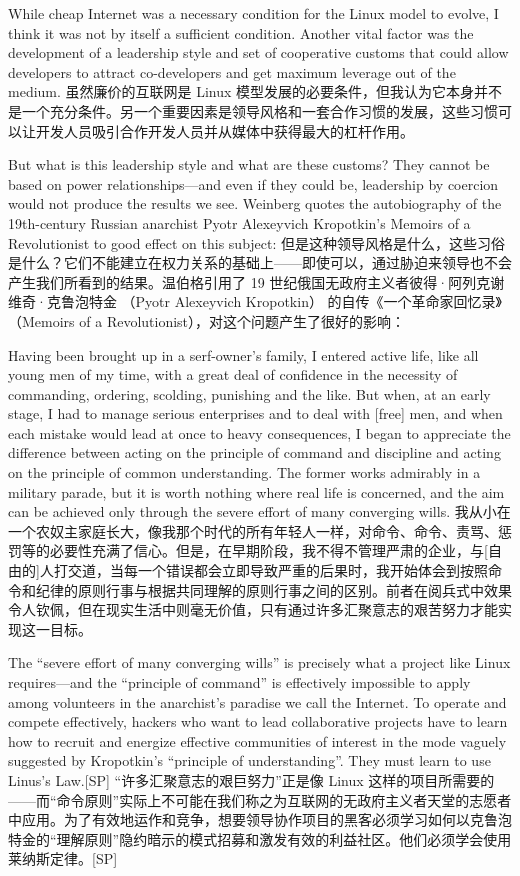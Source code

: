 \documentclass[a4paper,12pt,UTF8,twoside]{ctexbook}
\begin{document}
While cheap Internet was a necessary condition for the Linux model to evolve, I think it was not by itself a sufficient condition. Another vital factor was the development of a leadership style and set of cooperative customs that could allow developers to attract co-developers and get maximum leverage out of the medium.
虽然廉价的互联网是 Linux 模型发展的必要条件，但我认为它本身并不是一个充分条件。另一个重要因素是领导风格和一套合作习惯的发展，这些习惯可以让开发人员吸引合作开发人员并从媒体中获得最大的杠杆作用。

But what is this leadership style and what are these customs? They cannot be based on power relationships—and even if they could be, leadership by coercion would not produce the results we see. Weinberg quotes the autobiography of the 19th-century Russian anarchist Pyotr Alexeyvich Kropotkin's Memoirs of a Revolutionist to good effect on this subject:
但是这种领导风格是什么，这些习俗是什么？它们不能建立在权力关系的基础上——即使可以，通过胁迫来领导也不会产生我们所看到的结果。温伯格引用了 19 世纪俄国无政府主义者彼得·阿列克谢维奇·克鲁泡特金 （Pyotr Alexeyvich Kropotkin） 的自传《一个革命家回忆录》（Memoirs of a Revolutionist），对这个问题产生了很好的影响：

Having been brought up in a serf-owner's family, I entered active life, like all young men of my time, with a great deal of confidence in the necessity of commanding, ordering, scolding, punishing and the like. But when, at an early stage, I had to manage serious enterprises and to deal with [free] men, and when each mistake would lead at once to heavy consequences, I began to appreciate the difference between acting on the principle of command and discipline and acting on the principle of common understanding. The former works admirably in a military parade, but it is worth nothing where real life is concerned, and the aim can be achieved only through the severe effort of many converging wills.
我从小在一个农奴主家庭长大，像我那个时代的所有年轻人一样，对命令、命令、责骂、惩罚等的必要性充满了信心。但是，在早期阶段，我不得不管理严肃的企业，与[自由的]人打交道，当每一个错误都会立即导致严重的后果时，我开始体会到按照命令和纪律的原则行事与根据共同理解的原则行事之间的区别。前者在阅兵式中效果令人钦佩，但在现实生活中则毫无价值，只有通过许多汇聚意志的艰苦努力才能实现这一目标。

The ``severe effort of many converging wills'' is precisely what a project like Linux requires—and the ``principle of command'' is effectively impossible to apply among volunteers in the anarchist's paradise we call the Internet. To operate and compete effectively, hackers who want to lead collaborative projects have to learn how to recruit and energize effective communities of interest in the mode vaguely suggested by Kropotkin's ``principle of understanding''. They must learn to use Linus's Law.[SP]
“许多汇聚意志的艰巨努力”正是像 Linux 这样的项目所需要的——而“命令原则”实际上不可能在我们称之为互联网的无政府主义者天堂的志愿者中应用。为了有效地运作和竞争，想要领导协作项目的黑客必须学习如何以克鲁泡特金的“理解原则”隐约暗示的模式招募和激发有效的利益社区。他们必须学会使用莱纳斯定律。[SP]
\end{document}
